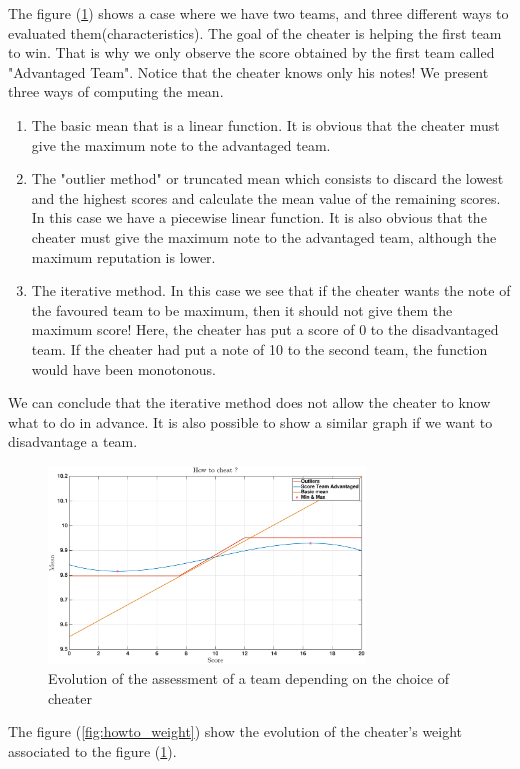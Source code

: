 \documentclass[12pt,a4paper]{article}
\begin{document}
The figure (\ref{fig:howto}) shows a case where we have two teams, and three different ways to evaluated them(characteristics). The goal of the cheater is helping the first team to win. That is why we only observe the score obtained by the first team called "Advantaged Team". Notice that the cheater knows only his notes! We present three ways of computing the mean.
\begin{enumerate}
    \item The basic mean that is a linear function. It is obvious that the cheater must give the maximum note to the advantaged team.
    \item The "outlier method" or truncated mean which consists to discard the lowest and the highest scores and calculate the mean value of the remaining scores. In this case we have a piecewise linear function. It is also obvious that the cheater must give the maximum note to the advantaged team, although the maximum reputation is lower.
    \item The iterative method. In this case we see that if the cheater wants the note of the favoured team to be maximum, then it should not give them the maximum score! Here, the cheater has put a score of 0 to the disadvantaged team. If the cheater had put a note of 10 to the second team, the function would have been monotonous.
\end{enumerate}
We can conclude that the iterative method does not allow the cheater to know what to do in advance. It is also possible to show a similar graph if we want to disadvantage a team.

\begin{figure}[h!]
\centering
\includegraphics[width = 0.75\textwidth]{cheaters/howto.eps}
\caption{Evolution of the assessment of a team depending on the choice of cheater}
\label{fig:howto}
\end{figure}

The figure (\ref{fig:howto_weight}) show the evolution of the cheater's weight associated to the figure (\ref{fig:howto}).
\end{document}
